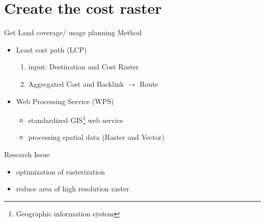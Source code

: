 \documentclass[usenames,dvipsnames,aspectratio=169]{beamer}
\begin{document}
\section{Create the cost raster}
\begin{frame}{Get Land coverage/ usage planning}
	Method
	\begin{itemize}
		\item Least cost path (LCP)
		\begin{enumerate}
			\item input: Destination and Cost Raster
			\item Aggregated Cost and Backlink $\rightarrow$ Route
		\end{enumerate}
		\item Web Processing Service (WPS)
		\begin{itemize}
			\item standardized GIS\footnote{Geographic information system} web service
			\item processing spatial data (Raster and Vector)
		\end{itemize}
	\end{itemize}
Research Issue
\begin{itemize}
\item optimization of rasterization
\item reduce area of high resolution raster
\end{itemize}
\end{frame}
\end{document}
